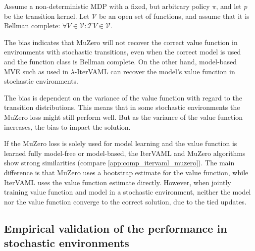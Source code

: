 \begin{proposition}
\label{prop:2}
    Assume a non-deterministic MDP with a fixed, but arbitrary policy $\pi$, and let $p$ be the transition kernel. 
    Let $\mathcal{V}$ be an open set of functions, and assume that it is Bellman complete: $\forall V \in \mathcal{V}: \mathcal{T}V \in \mathcal{V}$.
    
\end{proposition}

The bias indicates that MuZero will not recover the correct value function in environments with stochastic transitions, even when the correct model is used and the function class is Bellman complete.
On the other hand, model-based MVE such as used in $\lambda$-IterVAML can recover the model's value function in stochastic environments.

The bias is dependent on the variance of the value function with regard to the transition distributions.
This means that in some stochastic environments the MuZero loss might still perform well.
But as the variance of the value function increases, the bias to impact the solution.

If the MuZero loss is solely used for model learning and the value function is learned fully model-free or model-based, the IterVAML and MuZero algorithms show strong similarities (compare \autoref{app:comp_itervaml_muzero}). 
The main difference is that MuZero uses a bootstrap estimate for the value function, while IterVAML uses the value function estimate directly.
However, when jointly training value function and model in a stochastic environment, neither the model nor the value function converge to the correct solution, due to the tied updates.


\subsection{Empirical validation of the performance in stochastic environments}

